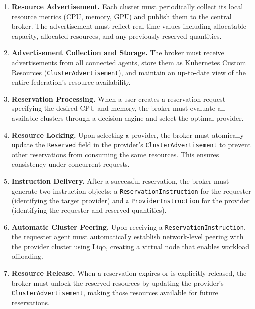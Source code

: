 \begin{enumerate}[label=\textbf{FR\arabic*}]
    \item \textbf{Resource Advertisement.}
    Each cluster must periodically collect its local resource metrics (CPU, memory, GPU) and publish them to the central broker. The advertisement must reflect real-time values including allocatable capacity, allocated resources, and any previously reserved quantities.

    \item \textbf{Advertisement Collection and Storage.}
    The broker must receive advertisements from all connected agents, store them as Kubernetes Custom Resources (\texttt{ClusterAdvertisement}), and maintain an up-to-date view of the entire federation's resource availability.

    \item \textbf{Reservation Processing.}
    When a user creates a reservation request specifying the desired CPU and memory, the broker must evaluate all available clusters through a decision engine and select the optimal provider.

    \item \textbf{Resource Locking.}
    Upon selecting a provider, the broker must atomically update the \texttt{Reserved} field in the provider's \texttt{ClusterAdvertisement} to prevent other reservations from consuming the same resources. This ensures consistency under concurrent requests.

    \item \textbf{Instruction Delivery.}
    After a successful reservation, the broker must generate two instruction objects: a \texttt{ReservationInstruction} for the requester (identifying the target provider) and a \texttt{ProviderInstruction} for the provider (identifying the requester and reserved quantities).

    \item \textbf{Automatic Cluster Peering.}
    Upon receiving a \texttt{ReservationInstruction}, the requester agent must automatically establish network-level peering with the provider cluster using Liqo, creating a virtual node that enables workload offloading.

    \item \textbf{Resource Release.}
    When a reservation expires or is explicitly released, the broker must unlock the reserved resources by updating the provider's \texttt{ClusterAdvertisement}, making those resources available for future reservations.
\end{enumerate}

